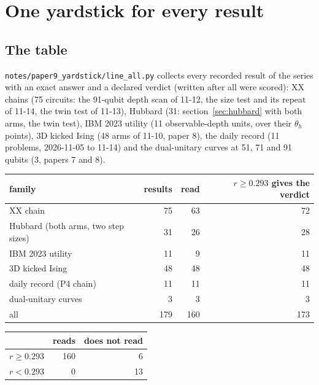 \documentclass[10pt,a4paper]{article}
\begin{document}
\section{One yardstick for every result}\label{sec:yardstick}
\subsection{The table}
\texttt{notes/paper9\_yardstick/line\_all.py} collects every recorded result of the series with an exact answer and a
declared verdict (written after all were scored): XX chains (75 circuits: the 91-qubit depth scan of 11-12, the size
test and its repeat of 11-14, the twin test of 11-13), Hubbard (31: section~\ref{sec:hubbard} with both arms, the twin
test), IBM 2023 utility (11 observable-depth units, over their $\theta_h$ points), 3D kicked Ising (48 arms of 11-10,
paper 8), the daily record (11 problems, 2026-11-05 to 11-14) and the dual-unitary curves at 51, 71 and 91 qubits (3,
papers 7 and 8).

\begin{center}\small
\begin{tabular}{lrrr}
\toprule
family & results & read & $r \ge 0.293$ gives the verdict \\
\midrule
XX chain & 75 & 63 & 72 \\
Hubbard (both arms, two step sizes) & 31 & 26 & 28 \\
IBM 2023 utility & 11 & 9 & 11 \\
3D kicked Ising & 48 & 48 & 48 \\
daily record (P4 chain) & 11 & 11 & 11 \\
dual-unitary curves & 3 & 3 & 3 \\
\midrule
all & 179 & 160 & 173 \\
\bottomrule
\end{tabular}
\qquad
\begin{tabular}{lrr}
\toprule
 & reads & does not read \\
\midrule
$r \ge 0.293$ & 160 & 6 \\
$r < 0.293$ & 0 & 13 \\
\bottomrule
\end{tabular}
\end{center}
\end{document}
